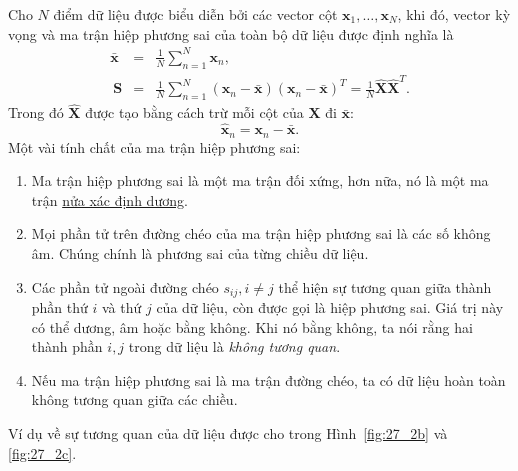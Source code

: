 Cho $N$ điểm dữ liệu được biểu diễn bởi các vector cột $\mathbf{x}_1, \dots, \mathbf{x}_N$, khi đó, {vector kỳ vọng} và {ma trận hiệp phương sai} của toàn bộ dữ liệu được định nghĩa là
\begin{eqnarray}
\bar{\mathbf{x}} &=& \frac{1}{N} \sum_{n=1}^N \mathbf{x}_n, \\\
\mathbf{S} &=&  \frac{1}{N}\sum_{n=1}^N (\mathbf{x}_n - \bar{\mathbf{x}})(\mathbf{x}_n - \bar{\mathbf{x}})^T = \frac{1}{N}\hat{\mathbf{X}}\hat{\mathbf{X}}^T.
\end{eqnarray}
Trong đó $\hat{\mathbf{X}}$ được tạo bằng cách trừ mỗi cột của $\mathbf{X}$ đi $\bar{\mathbf{x}}$:
\begin{equation}
\hat{\mathbf{x}}_n = \mathbf{x}_n - \bar{\mathbf{x}}.
\end{equation}
\newpage
Một vài tính chất của ma trận hiệp phương sai:
\begin{enumerate}

\item Ma trận hiệp phương sai là một ma trận đối xứng, hơn nữa, nó là một ma trận \href{https://machinelearningcoban.com/2017/03/12/convexity/#positive-semidefinite}{nửa xác định dương}.

\item Mọi phần tử trên đường chéo của ma trận hiệp phương sai là các số không âm. Chúng chính là phương sai của từng chiều dữ liệu.

\item Các phần tử ngoài đường chéo $s_{ij}, i \neq j$ thể hiện sự tương quan
giữa thành phần thứ $i$ và thứ $j$ của dữ liệu, còn được gọi là hiệp phương
sai. Giá trị này có thể dương, âm hoặc bằng không. Khi nó bằng không, ta nói
rằng hai thành phần $i, j$ trong dữ liệu là \textit{không tương quan}.

\item Nếu ma trận hiệp phương sai là ma trận đường chéo, ta có dữ liệu hoàn toàn không tương quan giữa các chiều.
\end{enumerate}

Ví dụ về sự tương quan của dữ liệu được cho trong Hình~\ref{fig:27_2b} và
\ref{fig:27_2c}.%

